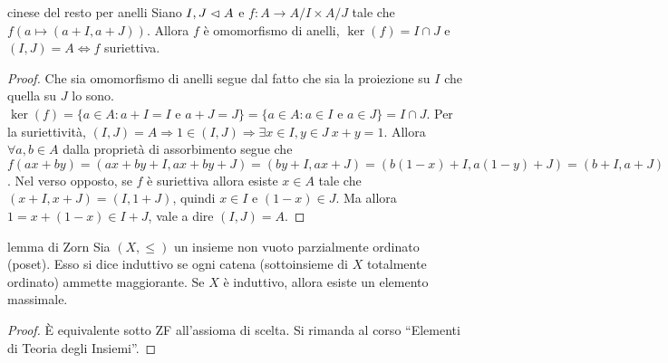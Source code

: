 \begin{theorem}{cinese del resto per anelli}
    Siano $I,J \vartriangleleft A$ e $f: A \rightarrow A/I \times A/J$ tale che $f(a \mapsto (a+I,a+J))$. Allora $f$ è omomorfismo di anelli, $\ker(f) = I\cap J$ e $(I,J) = A \iff f$ suriettiva. 
\end{theorem}
\begin{proof}
    Che sia omomorfismo di anelli segue dal fatto che sia la proiezione su $I$ che quella su $J$ lo sono.
    $\ker(f) = \{a \in A : a+I = I \text{ e } a+J = J\} = \{a \in A : a \in I \text{ e } a \in J\} = I \cap J$. Per la suriettività, $(I,J)= A \Rightarrow 1 \in (I,J) \Rightarrow \exists x \in I, y \in J \ x+y = 1$. Allora $\forall a,b \in A$ dalla proprietà di assorbimento segue che $f(ax+by) = (ax+by+I, ax+by+J) = (by + I, ax + J) = (b(1-x) + I, a(1-y) +J) = (b+I, a+J)$. Nel verso opposto, se $f$ è suriettiva allora esiste $x \in A$ tale che $(x+I, x+J) = (I,1+J)$, quindi $x \in I$ e $(1 - x) \in J$. Ma allora $1 = x + (1 - x) \in I + J$, vale a dire $(I, J) = A$.
\end{proof}
\begin{theorem}{lemma di Zorn}
    Sia $(X, \leq)$ un insieme non vuoto parzialmente ordinato (poset). Esso si dice induttivo se ogni catena (sottoinsieme di $X$ totalmente ordinato) ammette maggiorante. Se $X$ è induttivo, allora esiste un elemento massimale.
\end{theorem}
\begin{proof}
    È equivalente sotto ZF all'assioma di scelta. Si rimanda al corso ``Elementi di Teoria degli Insiemi''.
\end{proof}

